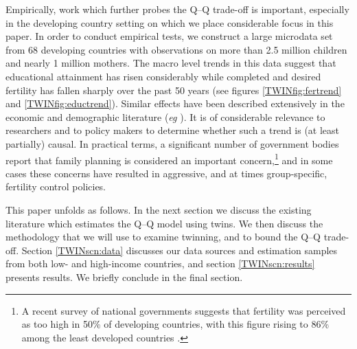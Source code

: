 \documentclass[subeqn]{article}
\begin{document}
\begin{spacing}{1.4}
Empirically, work which further probes the Q--Q trade-off is important,
especially in the developing country setting on which we place considerable 
focus in this paper. In order to conduct empirical tests, we construct a large 
microdata set from 68 developing countries with observations on more than 2.5 
million children and nearly 1 million mothers. The macro level trends in this 
data suggest that educational attainment has risen considerably while completed 
and desired fertility has fallen sharply over the past 50 years (see figures 
\ref{TWINfig:fertrend} and \ref{TWINfig:eductrend}). Similar effects have been 
described extensively in the economic and demographic literature (\emph{eg} 
\citet{Hanushek1992}). It is of considerable relevance to researchers and to 
policy makers to determine whether such a trend is (at least partially) causal.
In practical terms, a significant number of government bodies report that
family planning is considered an important concern,\footnote{A recent survey of 
national governments suggests that fertility was perceived as too high in 50\% 
of developing countries, with this figure rising to 86\% among the least 
developed countries \citet{UN2010}.}  and in some cases these concerns have 
resulted in aggressive, and at times group-specific, fertility control 
policies.  %

This paper unfolds as follows. In the next section we discuss the existing 
literature which estimates the Q--Q model using twins. We then discuss the 
methodology that we will use to examine twinning, and to bound the Q--Q 
trade-off.  Section \ref{TWINscn:data} discusses our data sources and 
estimation samples from both low- and high-income countries, and section 
\ref{TWINscn:results} presents results. We briefly conclude in the final 
section.


\end{spacing}
\end{document}
